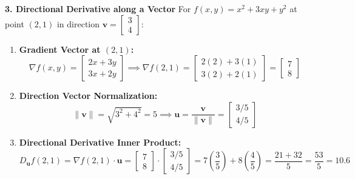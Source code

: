 \textbf{3. Directional Derivative along a Vector}
For $f(x, y) = x^2 + 3xy + y^2$ at point $(2, 1)$ in direction $\mathbf{v} = \begin{bmatrix} 3 \\ 4 \end{bmatrix}$:
\begin{enumerate}
    \item \textbf{Gradient Vector at $(2, 1)$:}
    \begin{equation*}
    \nabla f(x, y) = \begin{bmatrix} 2x + 3y \\ 3x + 2y \end{bmatrix} \implies \nabla f(2, 1) = \begin{bmatrix} 2(2) + 3(1) \\ 3(2) + 2(1) \end{bmatrix} = \begin{bmatrix} 7 \\ 8 \end{bmatrix}
    \end{equation*}
    \item \textbf{Direction Vector Normalization:}
    \begin{equation*}
    \|\mathbf{v}\| = \sqrt{3^2 + 4^2} = 5 \implies \mathbf{u} = \frac{\mathbf{v}}{\|\mathbf{v}\|} = \begin{bmatrix} 3/5 \\ 4/5 \end{bmatrix}
    \end{equation*}
    \item \textbf{Directional Derivative Inner Product:}
    \begin{equation*}
    D_{\mathbf{u}} f(2, 1) = \nabla f(2, 1) \cdot \mathbf{u} = \begin{bmatrix} 7 \\ 8 \end{bmatrix} \cdot \begin{bmatrix} 3/5 \\ 4/5 \end{bmatrix} = 7\left(\frac{3}{5}\right) + 8\left(\frac{4}{5}\right) = \frac{21 + 32}{5} = \frac{53}{5} = \mathbf{10.6}
    \end{equation*}
\end{enumerate}

